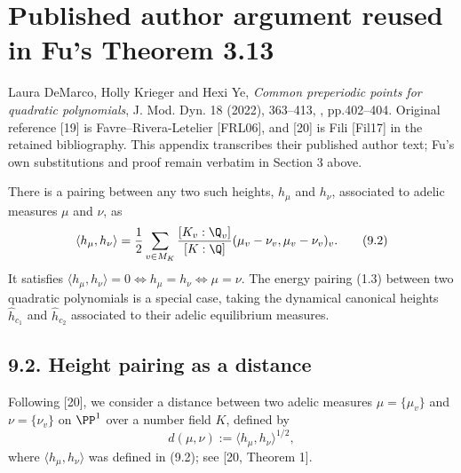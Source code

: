 \section*{Published author argument reused in Fu's Theorem 3.13}
\noindent Laura DeMarco, Holly Krieger and Hexi Ye, \emph{Common preperiodic points for quadratic polynomials}, J. Mod. Dyn. 18 (2022), 363--413, , pp.402--404. Original reference [19] is Favre--Rivera-Letelier [FRL06], and [20] is Fili [Fil17] in the retained bibliography. This appendix transcribes their published author text; Fu's own substitutions and proof remain verbatim in Section 3 above.

There is a pairing between any two such heights, $h_{\mu}$ and $h_{\nu}$, associated to adelic measures $\mu$ and $\nu$, as
\begin{equation}
\langle h_{\mu},h_{\nu}\rangle=\frac12\sum_{v\in M_K}\frac{[K_v:\Q_v]}{[K:\Q]}(\mu_v-\nu_v,\mu_v-\nu_v)_v.\tag{9.2}\label{DKY22:eq9.2}
\end{equation}
It satisfies $\langle h_{\mu},h_{\nu}\rangle=0\Longleftrightarrow h_{\mu}=h_{\nu}\Longleftrightarrow\mu=\nu$. The energy pairing (1.3) between two quadratic polynomials is a special case, taking the dynamical canonical heights $\hat h_{c_1}$ and $\hat h_{c_2}$ associated to their adelic equilibrium measures.

\subsection*{9.2. Height pairing as a distance}
Following [20], we consider a distance between two adelic measures $\mu=\{\mu_v\}$ and $\nu=\{\nu_v\}$ on $\PP^1$ over a number field $K$, defined by
\[
d(\mu,\nu):=\langle h_{\mu},h_{\nu}\rangle^{1/2},
\]
where $\langle h_{\mu},h_{\nu}\rangle$ was defined in (9.2); see [20, Theorem 1].

